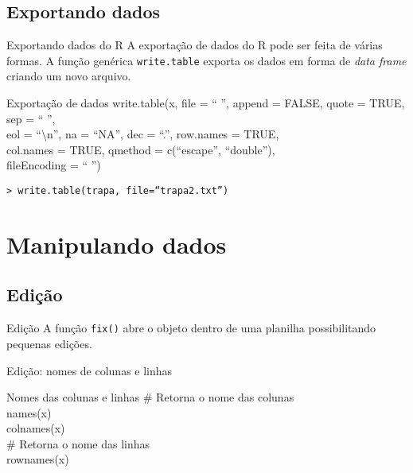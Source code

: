 \documentclass{beamer}
\begin{document}
\subsection{Exportando dados}
\begin{frame}{Exportando dados do R}
 A exportação de dados do R pode ser feita de várias formas. A função genérica  \texttt{write.table} exporta os dados em forma de \textit{data frame} criando um novo arquivo.
 \begin{block}{Exportação de dados}
 write.table(x, file = `` '', append = FALSE, quote = TRUE, sep = `` '',\\
     \hspace{45pt}  eol = ``\textbackslash n'', na = ``NA'', dec = ``.'', row.names = TRUE,\\
     \hspace{45pt}    col.names = TRUE, qmethod = c(``escape'', ``double''),\\
      \hspace{45pt}            fileEncoding = `` '')   
 \end{block}
\texttt{> write.table(trapa, file=``trapa2.txt'')}
  
\end{frame}

\section{Manipulando dados}
\subsection{Edição}
\begin{frame}{Edição}
 A função \texttt{fix()} abre o objeto dentro de uma planilha possibilitando pequenas edições. \\
\centering
{}
\end{frame}


\begin{frame}{Edição: nomes de colunas e linhas}

\begin{block}{Nomes das colunas e linhas}
\# Retorna o nome das colunas\\
names(x)\\
colnames(x)\\
\# Retorna o nome das linhas\\
rownames(x)\\
 \end{block}
\end{frame}
\end{document}
